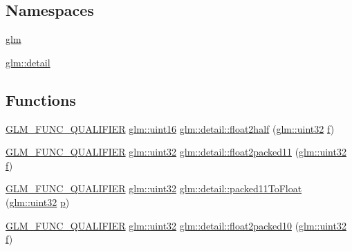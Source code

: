 \subsection*{Namespaces}
\begin{DoxyCompactItemize}
\item 
 \mbox{\hyperlink{namespaceglm}{glm}}
\item 
 \mbox{\hyperlink{namespaceglm_1_1detail}{glm\+::detail}}
\end{DoxyCompactItemize}
\subsection*{Functions}
\begin{DoxyCompactItemize}
\item 
\mbox{\hyperlink{setup_8hpp_a33fdea6f91c5f834105f7415e2a64407}{G\+L\+M\+\_\+\+F\+U\+N\+C\+\_\+\+Q\+U\+A\+L\+I\+F\+I\+ER}} \mbox{\hyperlink{group__gtc__type__precision_gad8c2939e1fdd8e5828b31d95c52255d5}{glm\+::uint16}} \mbox{\hyperlink{namespaceglm_1_1detail_a35cfc58b7112bdadd2610cf9f1780255}{glm\+::detail\+::float2half}} (\mbox{\hyperlink{group__gtc__type__precision_ga202b6a53c105fcb7e531f9b443518451}{glm\+::uint32}} \mbox{\hyperlink{_s_d_l__opengl__glext_8h_a691492ec0bd6383f91200e49f6ae40ed}{f}})
\item 
\mbox{\hyperlink{setup_8hpp_a33fdea6f91c5f834105f7415e2a64407}{G\+L\+M\+\_\+\+F\+U\+N\+C\+\_\+\+Q\+U\+A\+L\+I\+F\+I\+ER}} \mbox{\hyperlink{group__gtc__type__precision_ga202b6a53c105fcb7e531f9b443518451}{glm\+::uint32}} \mbox{\hyperlink{namespaceglm_1_1detail_af3fe5d54f7627eb98c3493ee0a4b6fba}{glm\+::detail\+::float2packed11}} (\mbox{\hyperlink{group__gtc__type__precision_ga202b6a53c105fcb7e531f9b443518451}{glm\+::uint32}} \mbox{\hyperlink{_s_d_l__opengl__glext_8h_a691492ec0bd6383f91200e49f6ae40ed}{f}})
\item 
\mbox{\hyperlink{setup_8hpp_a33fdea6f91c5f834105f7415e2a64407}{G\+L\+M\+\_\+\+F\+U\+N\+C\+\_\+\+Q\+U\+A\+L\+I\+F\+I\+ER}} \mbox{\hyperlink{group__gtc__type__precision_ga202b6a53c105fcb7e531f9b443518451}{glm\+::uint32}} \mbox{\hyperlink{namespaceglm_1_1detail_a02d2bd65041cc9eb287030ae553051f0}{glm\+::detail\+::packed11\+To\+Float}} (\mbox{\hyperlink{group__gtc__type__precision_ga202b6a53c105fcb7e531f9b443518451}{glm\+::uint32}} \mbox{\hyperlink{_s_d_l__opengl__glext_8h_aa5367c14d90f462230c2611b81b41d23}{p}})
\item 
\mbox{\hyperlink{setup_8hpp_a33fdea6f91c5f834105f7415e2a64407}{G\+L\+M\+\_\+\+F\+U\+N\+C\+\_\+\+Q\+U\+A\+L\+I\+F\+I\+ER}} \mbox{\hyperlink{group__gtc__type__precision_ga202b6a53c105fcb7e531f9b443518451}{glm\+::uint32}} \mbox{\hyperlink{namespaceglm_1_1detail_a066e984b6ff1a54325e8d11afed5a0f9}{glm\+::detail\+::float2packed10}} (\mbox{\hyperlink{group__gtc__type__precision_ga202b6a53c105fcb7e531f9b443518451}{glm\+::uint32}} \mbox{\hyperlink{_s_d_l__opengl__glext_8h_a691492ec0bd6383f91200e49f6ae40ed}{f}})

\end{DoxyCompactItemize}
